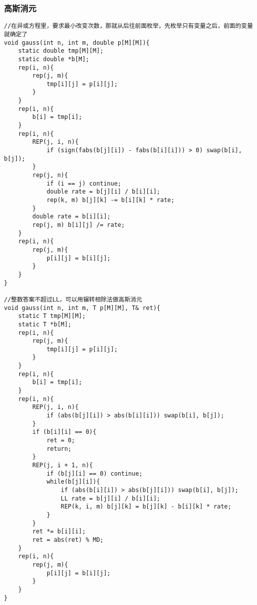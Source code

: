 \subsubsection{高斯消元}
\begin{verbatim}
//在异或方程里，要求最小改变次数，那就从后往前面枚举，先枚举只有变量之后，前面的变量就确定了
void gauss(int n, int m, double p[M][M]){
    static double tmp[M][M];
    static double *b[M];
    rep(i, n){
        rep(j, m){
            tmp[i][j] = p[i][j];
        }
    }
    rep(i, n){
        b[i] = tmp[i];
    }
    rep(i, n){
        REP(j, i, n){
            if (sign(fabs(b[j][i]) - fabs(b[i][i])) > 0) swap(b[i], b[j]);
        }
        rep(j, n){
            if (i == j) continue;
            double rate = b[j][i] / b[i][i];
            rep(k, m) b[j][k] -= b[i][k] * rate;
        }
        double rate = b[i][i];
        rep(j, m) b[i][j] /= rate;
    }
    rep(i, n){
        rep(j, m){
            p[i][j] = b[i][j];
        }
    }
}

//整数答案不超过LL，可以用辗转相除法做高斯消元
void gauss(int n, int m, T p[M][M], T& ret){
    static T tmp[M][M];
    static T *b[M];
    rep(i, n){
        rep(j, m){
            tmp[i][j] = p[i][j];
        }
    }
    rep(i, n){
        b[i] = tmp[i];
    }
    rep(i, n){
        REP(j, i, n){
            if (abs(b[j][i]) > abs(b[i][i])) swap(b[i], b[j]);
        }
        if (b[i][i] == 0){
            ret = 0;
            return;
        }
        REP(j, i + 1, n){
            if (b[j][i] == 0) continue;
            while(b[j][i]){
                if (abs(b[i][i]) > abs(b[j][i])) swap(b[i], b[j]);
                LL rate = b[j][i] / b[i][i];
                REP(k, i, m) b[j][k] = b[j][k] - b[i][k] * rate;
            }
        }
        ret *= b[i][i];
        ret = abs(ret) % MD;
    }
    rep(i, n){
        rep(j, m){
            p[i][j] = b[i][j];
        }
    }
}
\end{verbatim}
